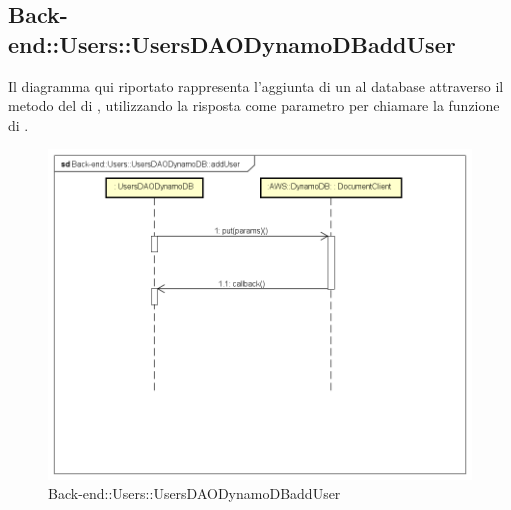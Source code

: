 \subsection{Back-end::Users::UsersDAODynamoDBaddUser}
Il diagramma qui riportato rappresenta l'aggiunta di un  al database attraverso il metodo  del  di , utilizzando la risposta come parametro per chiamare la funzione di .
\begin{figure}[h] \centering \includegraphics[width=\textwidth,height=\textheight,keepaspectratio]{images/diagrams/back-end/Ufficial_Backend/Back-endUsersUsersDAODynamoDBaddUser.png} 	\caption{Back-end::Users::UsersDAODynamoDBaddUser}
\end{figure} 
\newpage
